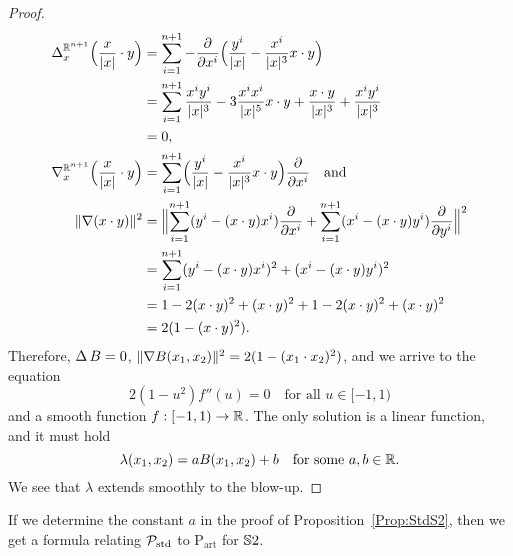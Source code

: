 \documentclass[\MainFolder/Text.tex]{subfiles}
\newcommand{\ArtPrpg}{\mathrm{P}_{\mathrm{art}}}
\begin{document}
\begin{proof}
\begin{align*}
\operatorname{\Delta}_x^{\mathbb{R}^{n+1}} \Bigl( \frac{x}{|x|}\cdot y \Bigr) &= \sum_{i=1}^{n+1} - \frac{\partial}{\partial x^i}\Bigl(\frac{y^i}{|x|} - \frac{x^i}{|x|^3}x\cdot y\Bigr) \\
 &= \sum_{i=1}^{n+1} \frac{x^i y^i}{|x|^3} - 3 \frac{x^i x^i}{|x|^5} x \cdot y + \frac{x\cdot y}{|x|^3} + \frac{x^i y^i}{|x|^3} \\
 & = 0,\\
\nabla^{\mathbb{R}^{n+1}}_x\Bigl(\frac{x}{|x|}\cdot y\Bigr) & = \sum_{i=1}^{n+1} \Bigl(\frac{y^i}{|x|} - \frac{x^i}{|x|^3}x\cdot y \Bigr)\frac{\partial}{\partial x^i}\quad\text{and}\\
\| \nabla (x\cdot y) \|^2 &= \Bigl\|\sum_{i=1}^{n+1}(y^i - (x\cdot y) x^i) \frac{\partial}{\partial x^i} + \sum_{i=1}^{n+1}(x^i - (x\cdot y) y^i) \frac{\partial}{\partial y^i}\Bigr\|^2 \\
& = \sum_{i=1}^{n+1} (y^i - (x\cdot y) x^i)^2 + (x^i - (x\cdot y)y^i)^2 \\
& = 1 - 2(x\cdot y)^2 + (x\cdot y)^2 + 1 - 2(x\cdot y)^2 + (x\cdot y)^2 \\
& = 2(1- (x\cdot y)^2).
\end{align*}
Therefore, $\operatorname{\Delta} B = 0$, $\| \nabla B(x_1,x_2) \|^2=2(1-(x_1\cdot x_2)^2)$, and we arrive to the equation
$$ 2(1-u^2) f''(u) = 0\quad \text{for all }u\in[-1,1) $$
and a smooth function $f: [-1,1) \rightarrow \mathbb{R}$. The only solution is a linear function, and it must hold
$$ \lambda(x_1,x_2) = a B(x_1, x_2) + b \quad\text{for some }a, b\in \mathbb{R}. $$
We see that $\lambda$ extends smoothly to the blow-up.
\end{proof}

If we determine the constant $a$ in the proof of Proposition~\ref{Prop:StdS2}, then we get a formula relating $\mathcal{P}_{\mathrm{std}}$ to $\ArtPrpg$ for $\mathbb{S}{2}$.

%
%
\end{document}
